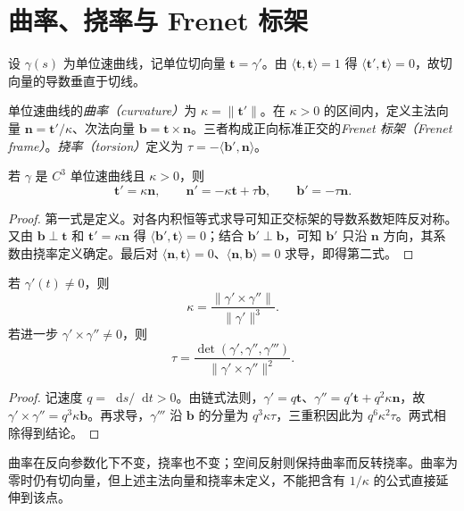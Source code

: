 \documentclass[UTF8,12pt,a4paper,fontset=fandol]{ctexbook}
\newcommand{\dd}{\mathop{}\!\mathrm d}
\newcommand{\ip}[2]{\langle #1,#2\rangle}
\newcommand{\norm}[1]{\lVert #1\rVert}
\begin{document}
\section{曲率、挠率与 Frenet 标架}
设 $\gamma(s)$ 为单位速曲线，记单位切向量 $\mathbf t=\gamma'$。由 $\ip{\mathbf t}{\mathbf t}=1$ 得 $\ip{\mathbf t'}{\mathbf t}=0$，故切向量的导数垂直于切线。
\begin{definition}
单位速曲线的\emph{曲率（curvature）}为 $\kappa=\norm{\mathbf t'}$。在 $\kappa>0$ 的区间内，定义主法向量 $\mathbf n=\mathbf t'/\kappa$、次法向量 $\mathbf b=\mathbf t\times\mathbf n$。三者构成正向标准正交的\emph{Frenet 标架（Frenet frame）}。\emph{挠率（torsion）}定义为 $\tau=-\ip{\mathbf b'}{\mathbf n}$。
\end{definition}

\begin{theorem}
若 $\gamma$ 是 $C^3$ 单位速曲线且 $\kappa>0$，则
\begin{equation}
 \mathbf t'=\kappa\mathbf n,\qquad
 \mathbf n'=-\kappa\mathbf t+\tau\mathbf b,\qquad
 \mathbf b'=-\tau\mathbf n.
 \label{eq:dg-frenet}
\end{equation}
\end{theorem}
\begin{proof}
第一式是定义。对各内积恒等式求导可知正交标架的导数系数矩阵反对称。又由 $\mathbf b\perp\mathbf t$ 和 $\mathbf t'=\kappa\mathbf n$ 得 $\ip{\mathbf b'}{\mathbf t}=0$；结合 $\mathbf b'\perp\mathbf b$，可知 $\mathbf b'$ 只沿 $\mathbf n$ 方向，其系数由挠率定义确定。最后对 $\ip{\mathbf n}{\mathbf t}=0$、$\ip{\mathbf n}{\mathbf b}=0$ 求导，即得第二式。
\end{proof}

\begin{proposition}[一般参数公式]
若 $\gamma'(t)\ne0$，则
\begin{equation}
 \kappa=\frac{\norm{\gamma'\times\gamma''}}{\norm{\gamma'}^3}.
 \label{eq:dg-curvature-general}
\end{equation}
若进一步 $\gamma'\times\gamma''\ne0$，则
\begin{equation}
 \tau=\frac{\det(\gamma',\gamma'',\gamma''')}{\norm{\gamma'\times\gamma''}^2}.
 \label{eq:dg-torsion-general}
\end{equation}
\end{proposition}
\begin{proof}
记速度 $q=\dd s/\dd t>0$。由链式法则，$\gamma'=q\mathbf t$、$\gamma''=q'\mathbf t+q^2\kappa\mathbf n$，故 $\gamma'\times\gamma''=q^3\kappa\mathbf b$。再求导，$\gamma'''$ 沿 $\mathbf b$ 的分量为 $q^3\kappa\tau$，三重积因此为 $q^6\kappa^2\tau$。两式相除得到结论。
\end{proof}
曲率在反向参数化下不变，挠率也不变；空间反射则保持曲率而反转挠率。曲率为零时仍有切向量，但上述主法向量和挠率未定义，不能把含有 $1/\kappa$ 的公式直接延伸到该点。
\end{document}
